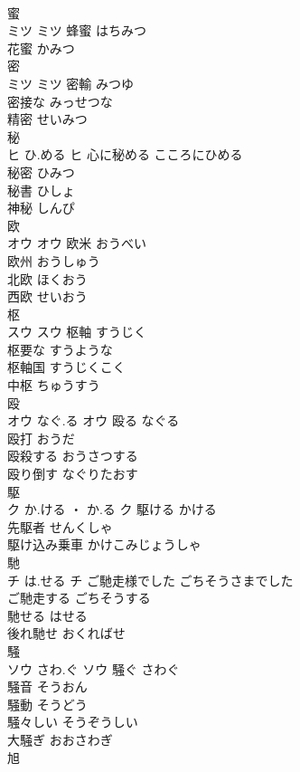 \documentclass[8pt]{extreport}
\begin{document}
\begin{CJK}{UTF8}{min}
\\	蜜	
\\	ミツ		ミツ	蜂蜜	はちみつ	
\\	花蜜	かみつ	
\\	密	
\\	ミツ		ミツ	密輸	みつゆ	
\\	密接な	みっせつな	
\\	精密	せいみつ	
\\	秘	
\\	ヒ	ひ.める	ヒ	心に秘める	こころにひめる	
\\	秘密	ひみつ	
\\	秘書	ひしょ	
\\	神秘	しんぴ	
\\	欧	
\\	オウ		オウ	欧米	おうべい	
\\	欧州	おうしゅう	
\\	北欧	ほくおう	
\\	西欧	せいおう	
\\	枢	
\\	スウ		スウ	枢軸	すうじく	
\\	枢要な	すうような	
\\	枢軸国	すうじくこく	
\\	中枢	ちゅうすう	
\\	殴	
\\	オウ	なぐ.る	オウ	殴る	なぐる	
\\	殴打	おうだ	
\\	殴殺する	おうさつする	
\\	殴り倒す	なぐりたおす	
\\	駆	
\\	ク	か.ける ・ か.る	ク	駆ける	かける	
\\	先駆者	せんくしゃ	
\\	駆け込み乗車	かけこみじょうしゃ	
\\	馳	
\\	チ	は.せる	チ	ご馳走様でした	ごちそうさまでした	
\\	ご馳走する	ごちそうする	
\\	馳せる	はせる	
\\	後れ馳せ	おくればせ	
\\	騒	
\\	ソウ	さわ.ぐ	ソウ	騒ぐ	さわぐ	
\\	騒音	そうおん	
\\	騒動	そうどう	
\\	騒々しい	そうぞうしい	
\\	大騒ぎ	おおさわぎ	
\\	旭	

\end{CJK}
\end{document}
